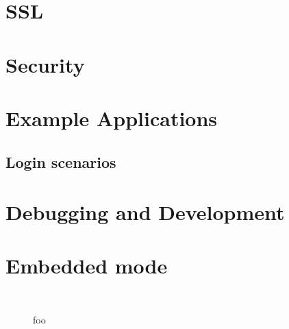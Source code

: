 \documentclass[11pt,oneside,english]{book}
\begin{document}
\chapter{SSL}

\chapter{Security}

\chapter{Example Applications}

\section{Login scenarios}

\chapter{Debugging and Development}


\chapter {Embedded mode}




\begin{figure}[h]
\begin{verbatim}


\end{verbatim}
\caption{foo}
\end{figure}
\end{document}
